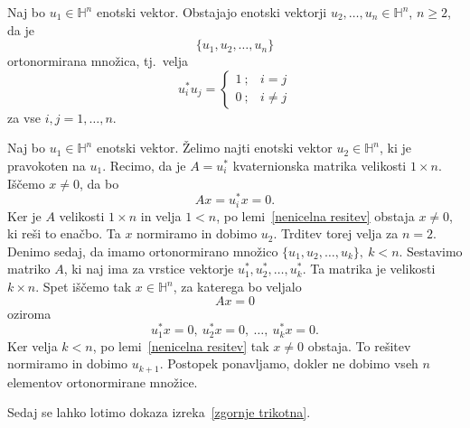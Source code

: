 \documentclass[mat1, tisk]{fmfdelo}
\numberwithin{equation}{section}
\begin{document}
\begin{lema}\label{onb}
    Naj bo $u_1 \in \mathbb{H}^n$ enotski vektor. Obstajajo enotski vektorji $u_2, \ldots, u_n \in \mathbb{H}^n$, $n \geq 2$, da je
    $$\{u_1, u_2, \ldots, u_n\}$$
    ortonormirana množica, tj.\ velja
    $$u_i^* u_j = 
    \begin{cases}
        1 \: ; & i = j \\
        0 \: ; & i \neq j
    \end{cases}$$
    za vse $i, j = 1, \ldots, n$.
\end{lema}

\begin{dokaz}
    Naj bo $u_1 \in \mathbb{H}^n$ enotski vektor. Želimo najti enotski vektor $u_2 \in \mathbb{H}^n$, ki je pravokoten
    na $u_1$. Recimo, da je $A = u_i^*$ kvaternionska matrika velikosti $1 \times n$. Iščemo $x \neq 0$, da bo
    $$Ax = u_i^*x = 0.$$
    Ker je $A$ velikosti $1 \times n$ in velja $1 < n$, po lemi~\ref{nenicelna resitev} obstaja $x \neq 0$, ki reši
    to enačbo. Ta $x$ normiramo in dobimo $u_2$. Trditev torej velja za $n=2$.
    Denimo sedaj, da imamo ortonormirano množico $\{u_1, u_2, \ldots, u_k\}, \: k < n$. Sestavimo matriko $A$, ki naj ima za vrstice
    vektorje $u_1^*, u_2^*, \ldots, u_k^*$. Ta matrika je velikosti $k \times n$. Spet iščemo tak $x \in \mathbb{H}^{n}$,
    za katerega bo veljalo
    $$Ax = 0$$
    oziroma
    $$u_1^*x = 0, \:
    u_2^*x = 0, \:
    \ldots, \:
    u_k^*x = 0.$$
    Ker velja $k<n$, po lemi~\ref{nenicelna resitev} tak $x \neq 0$ obstaja. To rešitev normiramo in dobimo $u_{k+1}$. 
    Postopek ponavljamo, dokler ne dobimo vseh $n$ elementov ortonormirane množice.
\end{dokaz}

Sedaj se lahko lotimo dokaza izreka~\ref{zgornje trikotna}.
\end{document}
